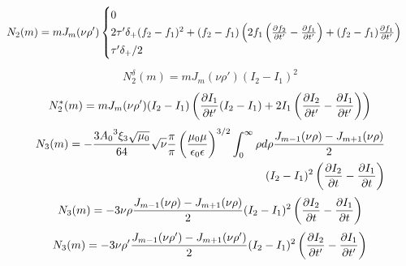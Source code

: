 %
\textcolor{lightgray} { \begin{equation*} \begin{aligned}
N_2 (m) = m J_m (\nu \rho') \begin{cases} 0 \\
2 \tau' \delta_+ (f_2 - f_1)^2 + (f_2 - f_1) 
\left( 2 f_1 \left( \frac{\partial f_2}{\partial t'} - \frac{\partial f_1}{\partial t'} \right) +
(f_2 - f_1) \frac{\partial f_1}{\partial t'} \right) \\
\tau' \delta_+ / 2
\end{cases} \end{aligned} \end{equation*} }
%
\begin{equation*} \begin{aligned}
N_2^\delta (m) = m J_m (\nu \rho') (I_2 - I_1)^2 
\end{aligned} \end{equation*}
%
\begin{equation*} \begin{aligned}
N_2^* (m) = m J_m (\nu \rho') (I_2 - I_1) \left( \frac{\partial I_1}{\partial t'} (I_2 - I_1) + 
2 I_1 \left( \frac{\partial I_2}{\partial t'} - \frac{\partial I_1}{\partial t'} \right) \right)
\end{aligned} \end{equation*}
%
\textcolor{lightgray} { \begin{equation*} \begin{aligned}
N_3 (m) = - \frac{3 {A_0}^3 \xi_3 \sqrt{\mu_0}}{64} \sqrt{\nu} \frac{\pi}{\pi}
\left( \frac{\mu_0 \mu} {\epsilon_0 \epsilon} \right)^{3/2} 
\int_{0}^{\infty} \rho d \rho 
\frac{J_{m-1} (\nu \rho) - J_{m+1} (\nu \rho)}{2} \\
(I_2 - I_1)^2 \left( \frac{\partial I_2}{\partial t} - \frac{\partial I_1}{\partial t} \right) 
\end{aligned} \end{equation*} }
%
\textcolor{lightgray} { \begin{equation*} \begin{aligned}
N_3 (m) = - 3 \nu \rho
\frac{J_{m-1} (\nu \rho) - J_{m+1} (\nu \rho)}{2}
(I_2 - I_1)^2 \left( \frac{\partial I_2}{\partial t} - \frac{\partial I_1}{\partial t} \right)
\end{aligned} \end{equation*} }
%
\begin{equation*} \begin{aligned}
N_3 (m) = - 3 \nu \rho'
\frac{J_{m-1} (\nu \rho') - J_{m+1} (\nu \rho')}{2}
(I_2 - I_1)^2 \left( \frac{\partial I_2}{\partial t'} - \frac{\partial I_1}{\partial t'} \right)
\end{aligned} \end{equation*}
